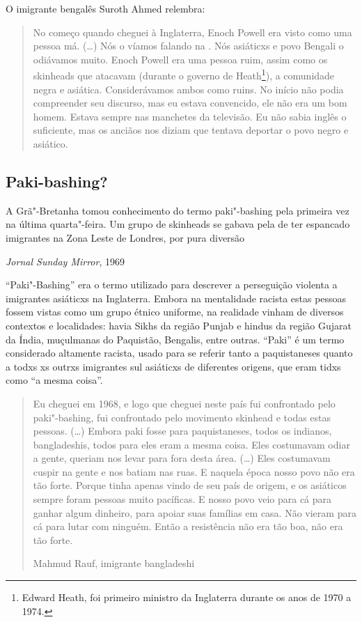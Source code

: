 O imigrante bengalês Suroth Ahmed relembra:

\begin{quote}
No começo quando cheguei à Inglaterra, Enoch Powell era visto como uma pessoa má. (\ldots{}) Nós o víamos falando na . Nós asiáticxs e povo Bengali o odiávamos muito. Enoch Powell era uma pessoa ruim, assim como os skinheads que atacavam (durante o governo de Heath\footnote{Edward Heath, foi primeiro ministro da Inglaterra durante os anos de 1970 a 1974.}), a comunidade negra e asiática. Considerávamos ambos como ruins. No início não podia compreender seu discurso, mas eu estava convencido, ele não era um bom homem. Estava sempre nas manchetes da televisão. Eu não sabia inglês o suficiente, mas os anciãos nos diziam que tentava deportar o povo negro e asiático.
\end{quote}

\subsection{Paki-bashing?}

\epigraph{A Grã"-Bretanha tomou conhecimento do termo paki"-bashing pela primeira vez na última quarta"-feira. Um grupo de skinheads se gabava pela  de ter espancado imigrantes na Zona Leste de Londres, por pura diversão}{\textit{Jornal Sunday Mirror}, 1969}

``Paki"-Bashing'' era o termo utilizado para descrever a perseguição violenta a imigrantes asiáticxs na Inglaterra. Embora na mentalidade racista estas pessoas fossem vistas como um grupo étnico uniforme, na realidade vinham de diversos contextos e localidades: havia Sikhs da região Punjab e hindus da região Gujarat da Índia, muçulmanas do Paquistão, Bengalis, entre outras. ``Paki'' é um termo considerado altamente racista, usado para se referir tanto a paquistaneses quanto a todxs xs outrxs imigrantes sul asiáticxs de diferentes origens, que eram tidxs como ``a mesma coisa''.

\begin{quote}
Eu cheguei em 1968, e logo que cheguei neste país fui confrontado pelo paki"-bashing, fui confrontado pelo movimento skinhead e todas estas pessoas. (\ldots{}) Embora paki fosse para paquistaneses, todos os indianos, bangladeshis, todos para eles eram a mesma coisa. Eles costumavam odiar a gente, queriam nos levar para fora desta área. (\ldots{}) Eles costumavam cuspir na gente e nos batiam nas ruas. E naquela época nosso povo não era tão forte. Porque tinha apenas vindo de seu país de origem, e os asiáticos sempre foram pessoas muito pacíficas. E nosso povo veio para cá para ganhar algum dinheiro, para apoiar suas famílias em casa. Não vieram para cá para lutar com ninguém. Então a resistência não era tão boa, não era tão forte.

Mahmud Rauf, imigrante bangladeshi
\end{quote}

